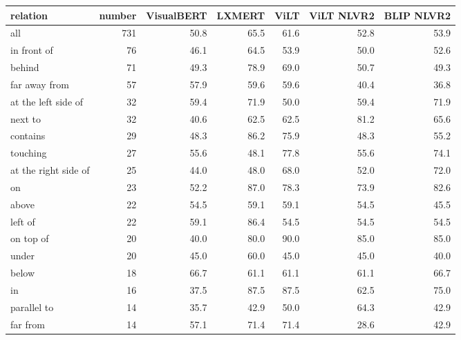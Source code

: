 \begin{table}[ht]
\centering
\begin{tabular}{lrrrrrr}
\toprule
relation &  number &  VisualBERT &  LXMERT &  ViLT &  ViLT NLVR2 &  BLIP NLVR2 \\
\midrule
all                  &     731 &        50.8 &    65.5 &  61.6 &        52.8 &        53.9 \\
\midrule
in front of          &      76 &        46.1 &    64.5 &  53.9 &        50.0 &        52.6 \\
behind               &      71 &        49.3 &    78.9 &  69.0 &        50.7 &        49.3 \\
far away from        &      57 &        57.9 &    59.6 &  59.6 &        40.4 &        36.8 \\
at the left side of  &      32 &        59.4 &    71.9 &  50.0 &        59.4 &        71.9 \\
next to              &      32 &        40.6 &    62.5 &  62.5 &        81.2 &        65.6 \\
contains             &      29 &        48.3 &    86.2 &  75.9 &        48.3 &        55.2 \\
touching             &      27 &        55.6 &    48.1 &  77.8 &        55.6 &        74.1 \\
at the right side of &      25 &        44.0 &    48.0 &  68.0 &        52.0 &        72.0 \\
on                   &      23 &        52.2 &    87.0 &  78.3 &        73.9 &        82.6 \\
above                &      22 &        54.5 &    59.1 &  59.1 &        54.5 &        45.5 \\
left of              &      22 &        59.1 &    86.4 &  54.5 &        54.5 &        54.5 \\
on top of            &      20 &        40.0 &    80.0 &  90.0 &        85.0 &        85.0 \\
under                &      20 &        45.0 &    60.0 &  45.0 &        45.0 &        40.0 \\
below                &      18 &        66.7 &    61.1 &  61.1 &        61.1 &        66.7 \\
in                   &      16 &        37.5 &    87.5 &  87.5 &        62.5 &        75.0 \\
parallel to          &      14 &        35.7 &    42.9 &  50.0 &        64.3 &        42.9 \\
far from             &      14 &        57.1 &    71.4 &  71.4 &        28.6 &        42.9 \\

\end{tabular}
\end{table}
